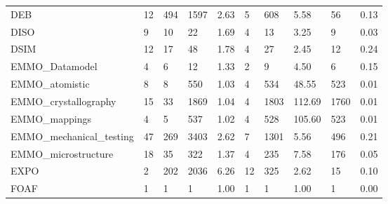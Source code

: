 \begin{tabular}{llllllllll}
DEB                         &                         12 &                        494 &            1597 &           2.63 &              5 &               608 &             5.58 &               56 &         0.13 \\
DISO                        &                          9 &                         10 &              22 &           1.69 &              4 &                13 &             3.25 &                9 &         0.03 \\
DSIM                        &                         12 &                         17 &              48 &           1.78 &              4 &                27 &             2.45 &               12 &         0.24 \\
EMMO\_Datamodel              &                          4 &                          6 &              12 &           1.33 &              2 &                 9 &             4.50 &                6 &         0.15 \\
EMMO\_atomistic              &                          8 &                          8 &             550 &           1.03 &              4 &               534 &            48.55 &              523 &         0.01 \\
EMMO\_crystallography        &                         15 &                         33 &            1869 &           1.04 &              4 &              1803 &           112.69 &             1760 &         0.01 \\
EMMO\_mappings               &                          4 &                          5 &             537 &           1.02 &              4 &               528 &           105.60 &              523 &         0.01 \\
EMMO\_mechanical\_testing     &                         47 &                        269 &            3403 &           2.62 &              7 &              1301 &             5.56 &              496 &         0.21 \\
EMMO\_microstructure         &                         18 &                         35 &             322 &           1.37 &              4 &               235 &             7.58 &              176 &         0.05 \\
EXPO                        &                          2 &                        202 &            2036 &           6.26 &             12 &               325 &             2.62 &               15 &         0.10 \\
FOAF                        &                          1 &                          1 &               1 &           1.00 &              1 &                 1 &             1.00 &                1 &         0.00 \\

\end{tabular}
